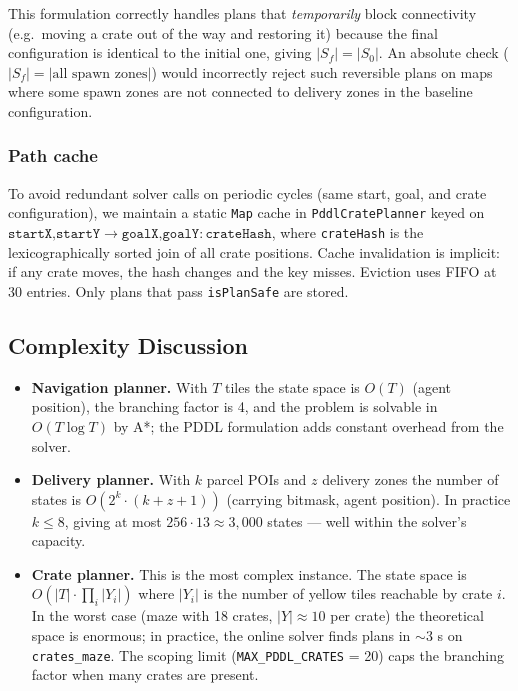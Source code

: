 \documentclass[10pt,a4paper,twocolumn]{article}
\begin{document}
This formulation correctly handles plans that \emph{temporarily} block
connectivity (e.g.\ moving a crate out of the way and restoring it) because the
final configuration is identical to the initial one, giving $|S_f| = |S_0|$.  An
absolute check ($|S_f| = |\text{all spawn zones}|$) would incorrectly reject
such reversible plans on maps where some spawn zones are not connected to
delivery zones in the baseline configuration.

\subsubsection*{Path cache}
To avoid redundant solver calls on periodic cycles (same start, goal, and crate
configuration), we maintain a static \texttt{Map} cache in
\texttt{PddlCratePlanner} keyed on
$\texttt{startX,startY} \to \texttt{goalX,goalY}:\texttt{crateHash}$, where
\texttt{crateHash} is the lexicographically sorted join of all crate positions.
Cache invalidation is implicit: if any crate moves, the hash changes and the
key misses.  Eviction uses FIFO at 30 entries.  Only plans that pass
\texttt{isPlanSafe} are stored.

\subsection{Complexity Discussion}

\begin{itemize}[noitemsep]
  \item \textbf{Navigation planner.}  With $T$ tiles the state space is $O(T)$
        (agent position), the branching factor is 4, and the problem is solvable
        in $O(T \log T)$ by A*; the PDDL formulation adds constant overhead from
        the solver.
  \item \textbf{Delivery planner.}  With $k$ parcel POIs and $z$ delivery zones
        the number of states is $O(2^k \cdot (k + z + 1))$ (carrying bitmask,
        agent position).  In practice $k \leq 8$, giving at most $256 \cdot 13
        \approx 3{,}000$ states — well within the solver's capacity.
  \item \textbf{Crate planner.}  This is the most complex instance.  The state
        space is $O(|T| \cdot \prod_i |Y_i|)$ where $|Y_i|$ is the number of
        yellow tiles reachable by crate $i$.  In the worst case (maze with 18
        crates, $|Y| \approx 10$ per crate) the theoretical space is enormous;
        in practice, the online solver finds plans in $\sim$3 s on
        \texttt{crates\_maze}.  The scoping limit (\texttt{MAX\_PDDL\_CRATES} = 20)
        caps the branching factor when many crates are present.
\end{itemize}
\end{document}
